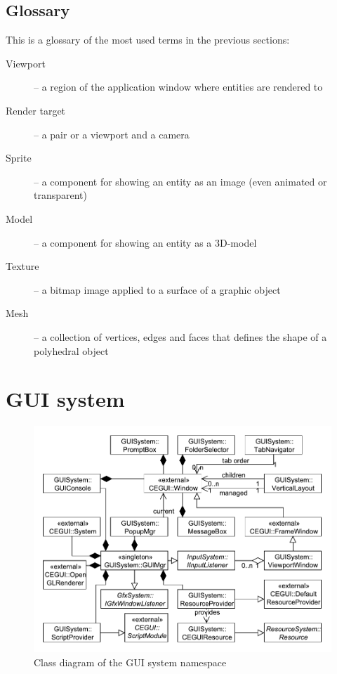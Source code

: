 \documentclass[a4paper, 12pt]{report}
\begin{document}
\section{Glossary}
This is a glossary of the most used terms in the previous sections:

\begin{description}
  \item[Viewport] -- a region of the application window where entities are rendered to
  \item[Render target] -- a pair or a viewport and a camera
  \item[Sprite] -- a component for showing an entity as an image (even animated or transparent)
  \item[Model] -- a component for showing an entity as a 3D-model
  \item[Texture] -- a bitmap image applied to a surface of a graphic object
  \item[Mesh] -- a collection of vertices, edges and faces that defines the shape of a polyhedral object
\end{description}


\chapter{GUI system}

\begin{figure}[htbp]
	\centering
		\includegraphics[width=1\textwidth]{GUISystemClassDiagram.pdf}
	\caption{Class diagram of the GUI system namespace}
	\label{fig:guisystem-diagram}
\end{figure}
\end{document}
